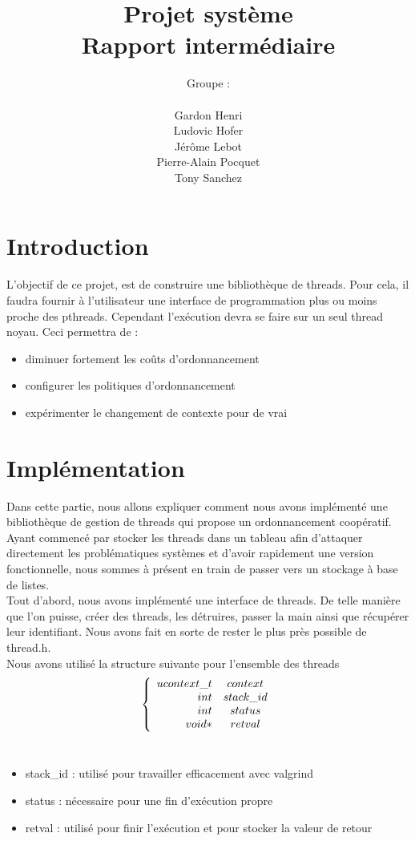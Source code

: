 \documentclass{article}
\author{Groupe :\\ \\Gardon Henri\\Ludovic Hofer\\Jérôme Lebot\\Pierre-Alain Pocquet\\Tony Sanchez}
\title{Projet système \\ Rapport intermédiaire}
\begin{document}
\maketitle

\section*{Introduction}
 
 L'objectif de ce projet, est de construire une bibliothèque de threads. Pour
cela, il faudra fournir à l'utilisateur une interface de programmation plus ou
moins proche des pthreads.
 Cependant l'exécution devra se faire sur un seul thread noyau.
 Ceci permettra de :
 \\
 \begin{itemize}
 \item diminuer fortement les coûts d'ordonnancement
 \item configurer les politiques d'ordonnancement
 \item expérimenter le changement de contexte pour de vrai
 \end{itemize}

\section{Implémentation}
 
 	Dans cette partie, nous allons expliquer comment nous avons implémenté une
bibliothèque de gestion de threads qui propose un ordonnancement coopératif.
Ayant commencé par stocker les threads dans un tableau afin d'attaquer directement
les problématiques systèmes et d'avoir rapidement une version fonctionnelle, nous
sommes à présent en train de passer vers un stockage à base de listes.
 \\
	Tout d'abord, nous avons implémenté une interface de threads. De telle manière
que l'on puisse, créer des threads, les détruires, passer la main ainsi que
récupérer leur identifiant. Nous avons fait en sorte de rester le plus près
possible de thread.h.
\\
Nous avons utilisé la structure suivante pour l'ensemble des threads
\\
\[
\left\{
\begin{array}{r c }
ucontext\_t &context\\
int &stack\_id\\
int & status\\
void* & retval
\end{array}
\right.
\]
\\
\begin{itemize}
\item stack\_id : utilisé pour travailler efficacement avec valgrind
\item status : nécessaire pour une fin d'exécution propre
\item retval : utilisé pour finir l'exécution et pour stocker la valeur de
  retour
\end{itemize}
\end{document}
